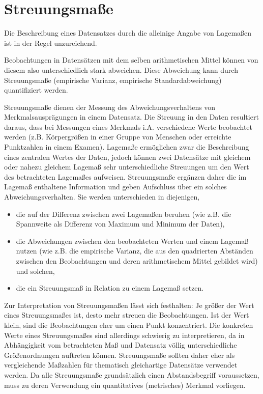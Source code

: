 \documentclass{lecture}
\begin{document}
    \section*{Streuungsmaße}

    Die Beschreibung eines Datensatzes durch die alleinige Angabe von Lagemaßen ist in der Regel unzureichend.

    Beobachtungen in Datensätzen mit dem selben arithmetischen Mittel können von diesem also unterschiedlich stark abweichen.
    Diese Abweichung kann durch Streuungsmaße (empirische Varianz, empirische Standardabweichung) quantifiziert werden.

    Streuungsmaße dienen der Messung des Abweichungsverhaltens von Merkmalsausprägungen in einem Datensatz.
    Die Streuung in den Daten resultiert daraus, dass bei Messungen eines Merkmals i.A. verschiedene Werte beobachtet werden (z.B. Körpergrößen in einer Gruppe von Menschen oder erreichte Punktzahlen in einem Examen).
    Lagemaße ermöglichen zwar die Beschreibung eines zentralen Wertes der Daten, jedoch können zwei Datensätze mit gleichem oder nahezu gleichem Lagemaß sehr unterschiedliche Streuungen um den Wert des betrachteten Lagemaßes aufweisen.
    Streuungsmaße ergänzen daher die im Lagemaß enthaltene Information und geben Aufschluss über ein solches Abweichungsverhalten.
    Sie werden unterschieden in diejenigen,
    \begin{itemize}
        \item die auf der Differenz zwischen zwei Lagemaßen beruhen (wie z.B. die Spannweite als Differenz von Maximum und Minimum der Daten),
        \item die Abweichungen zwischen den beobachteten Werten und einem Lagemaß nutzen (wie z.B. die empirische Varianz, die aus den quadrierten Abständen zwischen den Beobachtungen und deren arithmetischem Mittel gebildet wird) und solchen,
        \item die ein Streuungsmaß in Relation zu einem Lagemaß setzen.
    \end{itemize}
    Zur Interpretation von Streuungsmaßen lässt sich festhalten: Je größer der Wert eines Streuungsmaßes ist, desto mehr streuen die Beobachtungen.
    Ist der Wert klein, sind die Beobachtungen eher um einen Punkt konzentriert.
    Die konkreten Werte eines Streuungsmaßes sind allerdings schwierig zu interpretieren, da in Abhängigkeit vom betrachteten Maß und Datensatz völlig unterschiedliche Größenordnungen auftreten können.
    Streuungsmaße sollten daher eher als vergleichende Maßzahlen für thematisch gleichartige Datensätze verwendet werden.
    Da alle Streuungsmaße grundsätzlich einen Abstandsbegriff voraussetzen, muss zu deren Verwendung ein quantitatives (metrisches) Merkmal vorliegen.
\end{document}
